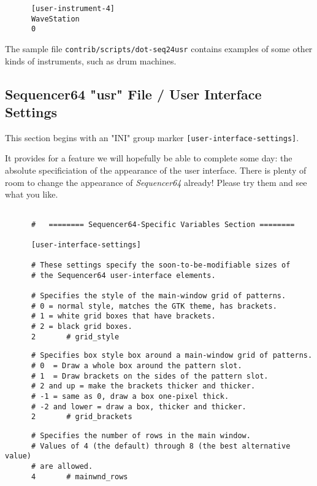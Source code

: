    \begin{verbatim}
      [user-instrument-4]
      WaveStation
      0
   \end{verbatim}

   The sample file \texttt{contrib/scripts/dot-seq24usr} contains examples
   of some other kinds of instruments, such as drum machines.

\subsection{Sequencer64 "usr" File / User Interface Settings}
\label{subsec:seq64_usr_file_user_interface_settings}

   This section begins with an
   "INI" group marker \texttt{[user-interface-settings]}.

   It provides for a feature we will hopefully be able to complete some day:
   the absolute specificiation of the appearance of the user interface.
   There is plenty of room to change the appearance of
   \textsl{Sequencer64} already!  Please try them and see what you like.

   \begin{verbatim}

      #   ======== Sequencer64-Specific Variables Section ========

      [user-interface-settings]

      # These settings specify the soon-to-be-modifiable sizes of
      # the Sequencer64 user-interface elements.

      # Specifies the style of the main-window grid of patterns.
      # 0 = normal style, matches the GTK theme, has brackets.
      # 1 = white grid boxes that have brackets.
      # 2 = black grid boxes.
      2       # grid_style
   \end{verbatim}

   \begin{verbatim}
      # Specifies box style box around a main-window grid of patterns.
      # 0  = Draw a whole box around the pattern slot.
      # 1  = Draw brackets on the sides of the pattern slot.
      # 2 and up = make the brackets thicker and thicker.
      # -1 = same as 0, draw a box one-pixel thick.
      # -2 and lower = draw a box, thicker and thicker.
      2       # grid_brackets
   \end{verbatim}

   \begin{verbatim}
      # Specifies the number of rows in the main window.
      # Values of 4 (the default) through 8 (the best alternative value)
      # are allowed.
      4       # mainwnd_rows
   \end{verbatim}

